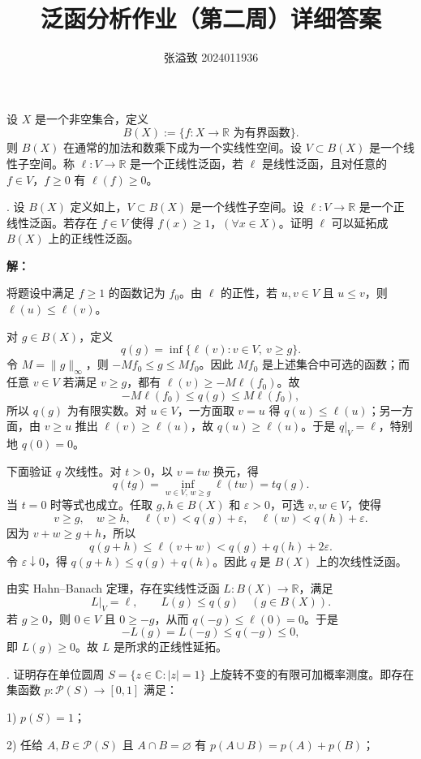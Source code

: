 \documentclass{article}
\title{泛函分析作业（第二周）详细答案}
\author{张溢致 2024011936}
\date{}
\begin{document}
\maketitle

设 $X$ 是一个非空集合，定义
\[
B(X):=\{f:X\to\mathbb R\text{ 为有界函数}\}.
\]
则 $B(X)$ 在通常的加法和数乘下成为一个实线性空间。设 $V\subset B(X)$ 是一个线性子空间。称 $\ell:V\to\mathbb R$ 是一个正线性泛函，若 $\ell$ 是线性泛函，且对任意的 $f\in V$，$f\ge0$ 有 $\ell(f)\ge0$。

\medskip
{}. 设 $B(X)$ 定义如上，$V\subset B(X)$ 是一个线性子空间。设 $\ell:V\to\mathbb R$ 是一个正线性泛函。若存在 $f\in V$ 使得 $f(x)\ge1$，$(\forall x\in X)$。证明 $\ell$ 可以延拓成 $B(X)$ 上的正线性泛函。

\textbf{解：}

将题设中满足 $f\ge1$ 的函数记为 $f_0$。由 $\ell$ 的正性，若 $u,v\in V$ 且 $u\le v$，则 $\ell(u)\le\ell(v)$。

对 $g\in B(X)$，定义
\[
q(g)=\inf\{\ell(v):v\in V,\ v\ge g\}.
\]
令 $M=\|g\|_\infty$，则 $-Mf_0\le g\le Mf_0$。因此 $Mf_0$ 是上述集合中可选的函数；而任意 $v\in V$ 若满足 $v\ge g$，都有 $\ell(v)\ge-M\ell(f_0)$。故
\[
-M\ell(f_0)\le q(g)\le M\ell(f_0),
\]
所以 $q(g)$ 为有限实数。对 $u\in V$，一方面取 $v=u$ 得 $q(u)\le\ell(u)$；另一方面，由 $v\ge u$ 推出 $\ell(v)\ge\ell(u)$，故 $q(u)\ge\ell(u)$。于是 $q|_V=\ell$，特别地 $q(0)=0$。

下面验证 $q$ 次线性。对 $t>0$，以 $v=tw$ 换元，得
\[
q(tg)=\inf_{w\in V,\,w\ge g}\ell(tw)=tq(g).
\]
当 $t=0$ 时等式也成立。任取 $g,h\in B(X)$ 和 $\varepsilon>0$，可选 $v,w\in V$，使得
\[
v\ge g,\quad w\ge h,\quad
\ell(v)<q(g)+\varepsilon,\quad\ell(w)<q(h)+\varepsilon.
\]
因为 $v+w\ge g+h$，所以
\[
q(g+h)\le\ell(v+w)<q(g)+q(h)+2\varepsilon.
\]
令 $\varepsilon\downarrow0$，得 $q(g+h)\le q(g)+q(h)$。因此 $q$ 是 $B(X)$ 上的次线性泛函。

由实 Hahn--Banach 定理，存在实线性泛函 $L:B(X)\to\mathbb R$，满足
\[
L|_V=\ell,\qquad L(g)\le q(g)\quad(g\in B(X)).
\]
若 $g\ge0$，则 $0\in V$ 且 $0\ge-g$，从而 $q(-g)\le\ell(0)=0$。于是
\[
-L(g)=L(-g)\le q(-g)\le0,
\]
即 $L(g)\ge0$。故 $L$ 是所求的正线性延拓。


\medskip
{}. 证明存在单位圆周 $S=\{z\in\mathbb C:|z|=1\}$ 上旋转不变的有限可加概率测度。即存在集函数 $p:\mathcal P(S)\to[0,1]$ 满足：

1) $p(S)=1$；

2) 任给 $A,B\in\mathcal P(S)$ 且 $A\cap B=\varnothing$ 有 $p(A\cup B)=p(A)+p(B)$；
\end{document}
